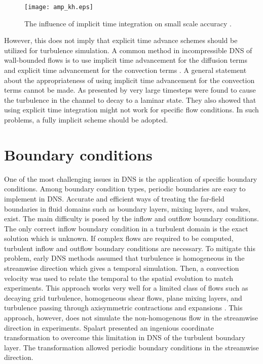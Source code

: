 \documentclass[12pt,oneside,a4paper,english]{article}
\begin{document}
\begin{figure}[H]
    \centering
    \texttt{[image: amp\_kh.eps]}
    \caption[The influence of implicit time integration on small scale accuracy]{The influence of implicit time integration on small scale accuracy \cite{Kardashian1998}.}
    \label{fig_amplitude_four_1}
\end{figure}

However, this does not imply that explicit time advance schemes should be utilized for turbulence simulation. A common method in incompressible DNS of wall-bounded flows is to use implicit time advancement for the diffusion terms and explicit time advancement for the convection terms \cite{TWORZYDLO1992245}. A general statement about the appropriateness of using implicit time advancement for the convection terms cannot be made. As presented by \cite{choi1994effects} very large timesteps were found to cause the turbulence in the channel to decay to a laminar state. They also showed that using explicit time integration might not work for specific flow conditions. In such problems, a fully implicit scheme should be adopted.

\section{Boundary conditions}
One of the most challenging issues in DNS is the application of specific boundary conditions. Among boundary condition types, periodic boundaries are easy to implement in DNS. Accurate and efficient ways of treating the far-field boundaries in fluid domains such as boundary layers, mixing layers, and wakes, exist. The main difficulty is posed by the inflow and outflow boundary conditions. The only correct inflow boundary condition in a turbulent domain is the exact solution \cite{jiang1999non} which is unknown. If complex flows are required to be computed, turbulent inflow and outflow boundary conditions are necessary. To mitigate this problem, early DNS methods assumed that turbulence is homogeneous in the streamwise direction which gives a temporal simulation. Then, a convection velocity was used to relate the temporal to the spatial evolution to match experiments. This approach works very well for a limited class of flows such as decaying grid turbulence, homogeneous shear flows, plane mixing layers, and turbulence passing through axisymmetric contractions and expansions \cite{Kardashian1998}. This approach, however, does not simulate the non-homogenous flow in the streamwise direction in experiments. Spalart \cite{spalart_1988} presented an ingenious coordinate transformation to overcome this limitation in DNS of the turbulent boundary layer. The transformation allowed periodic boundary conditions in the streamwise direction.
\end{document}

